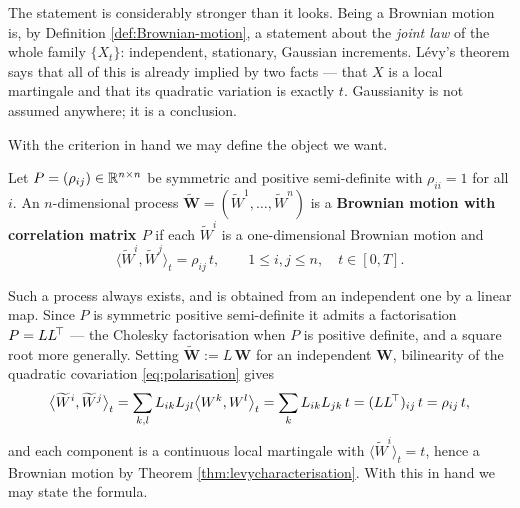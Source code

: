 The statement is considerably stronger than it looks. Being a Brownian motion is, by Definition \ref{def:Brownian-motion}, a statement about the \emph{joint law} of the whole family $\{X_t\}$: independent, stationary, Gaussian increments. Lévy's theorem says that all of this is already implied by two facts --- that $X$ is a local martingale and that its quadratic variation is exactly $t$. Gaussianity is not assumed anywhere; it is a conclusion.


With the criterion in hand we may define the object we want.

\begin{definition}\label{def:correlatedbm}
Let $P = (\rho_{ij}) \in \mathbb{R}^{n\times n}$ be symmetric and positive semi-definite with 
$\rho_{ii} = 1$ for all $i$. An $n$-dimensional process 
$\widetilde{\mathbf{W}} = (\widetilde W^1, \dots, \widetilde W^n)$ is a \textbf{Brownian motion with 
correlation matrix $P$} if each $\widetilde W^i$ is a one-dimensional Brownian motion and
\begin{equation}\label{eq:correlatedbm}
\bigl\langle \widetilde W^i, \widetilde W^j \bigr\rangle_t = \rho_{ij}\,t, \qquad 1 \leq i,j \leq n, \quad t \in [0,T].
\end{equation}
\end{definition}

Such a process always exists, and is obtained from an independent one by a linear map. Since $P$ is 
symmetric positive semi-definite it admits a factorisation $P = LL^{\!\top}$ --- the Cholesky 
factorisation when $P$ is positive definite, and a square root more generally. Setting 
$\widetilde{\mathbf{W}} := L\,\mathbf{W}$ for an independent $\mathbf{W}$, bilinearity of the 
quadratic covariation \eqref{eq:polarisation} gives
\[
\bigl\langle \widetilde W^i, \widetilde W^j \bigr\rangle_t 
= \sum_{k,l} L_{ik}L_{jl} \bigl\langle W^k, W^l \bigr\rangle_t 
= \sum_{k} L_{ik}L_{jk}\,t = (LL^{\!\top})_{ij}\,t = \rho_{ij}\,t,
\]
and each component is a continuous local martingale with $\langle \widetilde W^i\rangle_t = t$, hence 
a Brownian motion by Theorem \ref{thm:levycharacterisation}. With this in hand we may state the formula.

